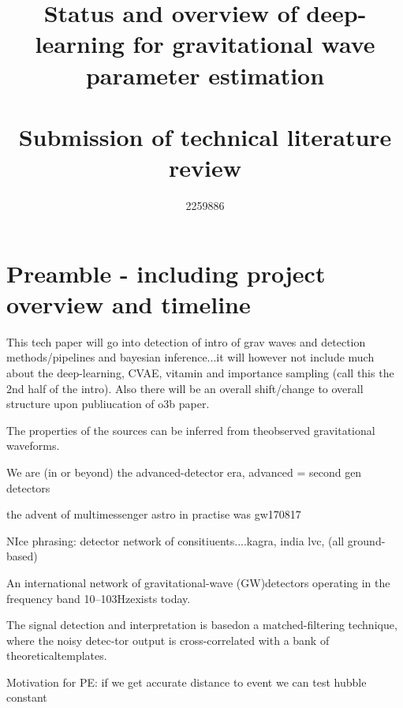 \documentclass[11pt]{article}
\title{\bf{Status and overview of deep-learning for gravitational wave parameter estimation}\\~\\
\large Submission of technical literature review}
\author{2259886}
\begin{document}
\maketitle








\tableofcontents

\section{Preamble - including project overview and timeline}

This tech paper will go into detection of intro of grav waves and detection methods/pipelines and bayesian inference...it will however not include much about the deep-learning, CVAE, vitamin and importance sampling (call this the 2nd half of the intro). Also there will be an overall shift/change to overall structure upon publiucation of o3b paper.

The properties of the sources can be inferred from theobserved gravitational waveforms.

We are (in or beyond) the advanced-detector era, advanced = second gen detectors

the advent of multimessenger astro in practise was gw170817 

NIce phrasing: detector network of consitiuents....kagra, india lvc, (all ground-based)

An international network of gravitational-wave (GW)detectors operating in the frequency band 10–103Hzexists today.

The signal detection and interpretation is basedon a matched-filtering technique, where the noisy detec-tor output is cross-correlated with a bank of theoreticaltemplates.

Motivation for PE: if we get accurate distance to event we can test hubble constant
\end{document}
